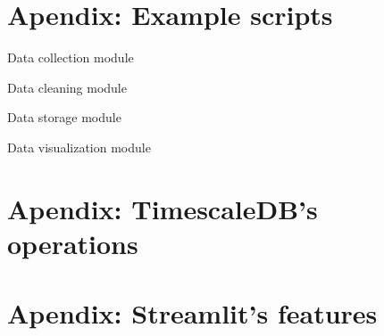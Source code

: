 
\chapter{Apendix: Example scripts}\label{chap:appendixb}

Data collection module

Data cleaning module

Data storage module

Data visualization module



\chapter{Apendix: TimescaleDB's operations}\label{chap:appendixa}



\chapter{Apendix: Streamlit's features}\label{chap:appendixb}
